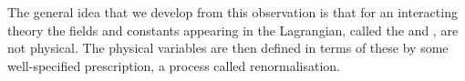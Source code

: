 \documentclass[fleqn]{NotesClass}
\begin{document}
    The general idea that we develop from this observation is that for an interacting theory the fields and constants appearing in the Lagrangian, called the  and , are not physical.
    The physical variables are then defined in terms of these by some well-specified prescription, a process called renormalisation.
    
    
    
    
    \appendixpage
    \begin{appendices}
        
        
        
    \end{appendices}
    
    \backmatter
    \renewcommand{\glossaryname}{Acronyms}
    \printglossary[acronym]
    \printindex
\end{document}
